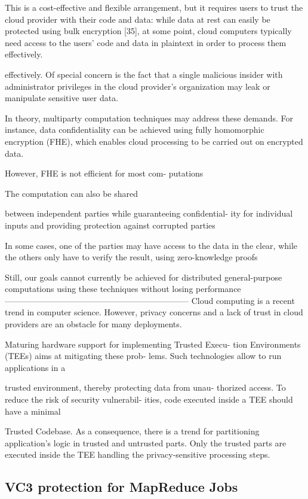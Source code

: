 \begin{itemize}
This is a
cost-effective and flexible arrangement, but it requires users to
trust the cloud provider with their code and data: while data
at rest can easily be protected using bulk encryption [35],
at some point, cloud computers typically need access to
the users’ code and data in plaintext in order to process
them effectively.

effectively. Of special concern is the fact that a single
malicious insider with administrator privileges in the cloud
provider’s organization may leak or manipulate sensitive user
data.

In theory, multiparty computation techniques may address
these demands. For instance, data confidentiality can be
achieved using fully homomorphic encryption (FHE), which
enables cloud processing to be carried out on encrypted data.

However, FHE is not efficient for most com-
putations

The computation can also be shared

between independent parties while guaranteeing confidential-
ity for individual inputs and providing protection against corrupted parties

In some cases, one of the parties may have
access to the data in the clear, while the others only have
to verify the result, using zero-knowledge proofs

Still, our goals
cannot currently be achieved for distributed general-purpose
computations using these techniques without losing performance
------------------------------------------------------------------
Cloud computing is a recent trend in computer science.
However, privacy concerns and a lack of trust in cloud
providers are an obstacle for many deployments.

Maturing hardware support for implementing Trusted Execu-
tion Environments (TEEs) aims at mitigating these prob-
lems. Such technologies allow to run applications in a

trusted environment, thereby protecting data from unau-
thorized access. To reduce the risk of security vulnerabil-
ities, code executed inside a TEE should have a minimal

Trusted Codebase. As a consequence, there is a trend for
partitioning application’s logic in trusted and untrusted
parts. Only the trusted parts are executed inside the TEE
handling the privacy-sensitive processing steps.

\subsection{VC3 protection for MapReduce Jobs}


\end{itemize}
